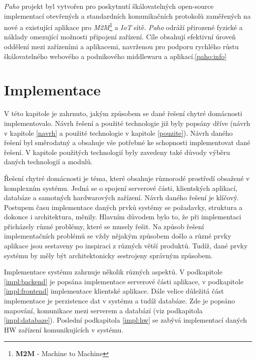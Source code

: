 \emph{Paho} projekt byl vytvořen pro poskytnutí škálovatelných open-source implementací otevřených a standardních komunikačních protokolů zaměřených na nové a
existující aplikace pro \emph{M2M}\footnote{\textbf{M2M} - Machine to Machine} a \emph{IoT} sítě.
\emph{Paho} odráží přirozené fyzické a náklady omezující možnosti připojení zařízení.
Cíle obsahují efektivní úroveň oddělení mezi zařízeními a aplikacemi, navrženou pro podporu rychlého růstu škálovatelného webového a podnikového middlewaru a aplikací.\ref{paho:info}

\chapter{Implementace}
\label{impl}
V této kapitole je zahrnuto, jakým způsobem se dané řešení chytré domácnosti implementovalo.
Návrh řešení a použité technologie již byly popsány dříve (návrh v kapitole \ref{navrh} a použité technologie v kapitole \ref{pouzite}).
Návrh daného řešení byl směrodatný a obsahuje vše potřebné ke schopnosti implementovat dané řešení.
V kapitole použitých technologií byly zavedeny také důvody výběru daných technologií a modulů.

Řešení chytré domácnosti je téma, které obsahuje různorodé prostředí obsažené v komplexním systému.
Jedná se o spojení serverové části, klientských aplikací, databáze a samotných hardwarových zařízení.
Návrh daného řešení je klíčový.
Postupem času implementace daných prvků systémy se požadavky, struktura a dokonce i architektura, měnily.
Hlavním důvodem bylo to, že při implementaci přicházely různé problémy, které se musely řešit.
Na způsob řešení implementačních problémů se vždy nějakým způsobem došlo a různé prvky aplikace jsou sestaveny po inspiraci z různých větší produktů.
Tudíž, dané prvky systému by měly být architektonicky sestrojeny správným způsobem.

Implementace systému zahrnuje několik různých aspektů.
V podkapitole \ref{impl:backend} je popsána implementace serverové části aplikace, v podkapitole \ref{impl:frontend} implementace klientské aplikace.
Dále velice důležitá část implementace je perzistence dat v systému a tudíž databáze. Zde je popsáno mapování, komunikace mezi serverem a databází (viz podkapitola \ref{impl:databaze}).
Poslední podkapitola \ref{impl:hw} se zabývá implementací daných HW zařízení komunikujících v systému.


